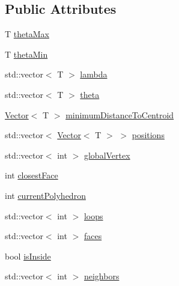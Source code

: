 \subsection*{Public Attributes}
\begin{DoxyCompactItemize}
\item 
T \hyperlink{classccmc_1_1_polyhedron_a4d7f2eaadb816292d2f8fa169f15599e}{theta\-Max}
\item 
T \hyperlink{classccmc_1_1_polyhedron_a6f7b5d5e06047d56e6ec6c01ce992041}{theta\-Min}
\item 
std\-::vector$<$ T $>$ \hyperlink{classccmc_1_1_polyhedron_ae398caeb579041f8da9261484deb4eed}{lambda}
\item 
std\-::vector$<$ T $>$ \hyperlink{classccmc_1_1_polyhedron_ac590d3e84e9c6d413b6054de49ac3245}{theta}
\item 
\hyperlink{classccmc_1_1_vector}{Vector}$<$ T $>$ \hyperlink{classccmc_1_1_polyhedron_afd77b1f8d574323a5b4e1b694890b7dc}{minimum\-Distance\-To\-Centroid}
\item 
std\-::vector$<$ \hyperlink{classccmc_1_1_vector}{Vector}$<$ T $>$ $>$ \hyperlink{classccmc_1_1_polyhedron_a41195440d2192a6118e2990f09183179}{positions}
\item 
std\-::vector$<$ int $>$ \hyperlink{classccmc_1_1_polyhedron_aa16a2a05fcbafa0c99fc6b5de21672cc}{global\-Vertex}
\item 
int \hyperlink{classccmc_1_1_polyhedron_a50889e065612d1cd397cd7942349bb7b}{closest\-Face}
\item 
int \hyperlink{classccmc_1_1_polyhedron_af684c14a5bfee6f3e29cdd1879da8aba}{current\-Polyhedron}
\item 
std\-::vector$<$ int $>$ \hyperlink{classccmc_1_1_polyhedron_a275e8b1b13a16013da6bd125e203fd2c}{loops}
\item 
std\-::vector$<$ int $>$ \hyperlink{classccmc_1_1_polyhedron_a85b5d967346fc1fd362b22bd0359cc4e}{faces}
\item 
bool \hyperlink{classccmc_1_1_polyhedron_a54e8c54feeac70b1bd3c1eaf4c237058}{is\-Inside}
\item 
std\-::vector$<$ int $>$ \hyperlink{classccmc_1_1_polyhedron_aa5b2b229e4e08b8ff1c03ff78fcb6a3b}{neighbors}
\end{DoxyCompactItemize}

